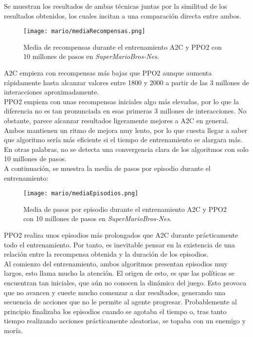 \documentclass[11pt,fleqn]{book} %
\begin{document}
Se muestran los resultados de ambas técnicas juntas por la similitud de los resultados obtenidos, los cuales incitan a una comparación directa entre ambos.

\begin{figure}[H]
	\centering\texttt{[image: mario/mediaRecompensas.png]}
	\caption{Media de recompensas durante el entrenamiento A2C y PPO2 con 10 millones de pasos en \textit{SuperMarioBros-Nes}.}
	\label{fig:mariorecompensas} %
\end{figure}

A2C empieza con recompensas más bajas que PPO2 aunque aumenta rápidamente hasta alcanzar valores entre 1800 y 2000 a partir de las 3 millones de interacciones aproximadamente.\\

PPO2 empieza con unas recompensas iniciales algo más elevadas, por lo que la diferencia no es tan pronunciada en esas primeras 3 millones de interacciones. No obstante, parece alcanzar resultados ligeramente mejores a A2C en general. Ambos mantienen un ritmo de mejora muy lento, por lo que cuesta llegar a saber que algoritmo sería más eficiente si el tiempo de entrenamiento se alargara más. En otras palabras, no se detecta una convergencia clara de los algoritmos con solo 10 millones de pasos. \\

A continuación, se muestra la media de pasos por episodio durante el entrenamiento:

\begin{figure}[H]
	\centering\texttt{[image: mario/mediaEpisodios.png]}
	\caption{Media de pasos por episodio durante el entrenamiento A2C y PPO2 con 10 millones de pasos en \textit{SuperMarioBros-Nes}.}
	\label{fig:marioepisodios} %
\end{figure}

PPO2 realiza unos episodios más prolongados que A2C durante prácticamente todo el entrenamiento. Por tanto, es inevitable pensar en la existencia de una relación entre la recompensa obtenida y la duración de los episodios. \\

Al comienzo del entrenamiento, ambos algoritmos presentan episodios muy largos, esto llama mucho la atención. El origen de esto, es que las políticas se encuentran tan iniciales, que aún no conocen la dinámica del juego. Esto provoca que no avancen y cueste mucho comenzar a dar resultados, generando una secuencia de acciones que no le permite al agente progresar. Probablemente al principio finalizaba los episodios cuando se agotaba el tiempo o, tras tanto tiempo realizando acciones prácticamente aleatorias, se topaba con un enemigo y moría. \\ 
\end{document}
